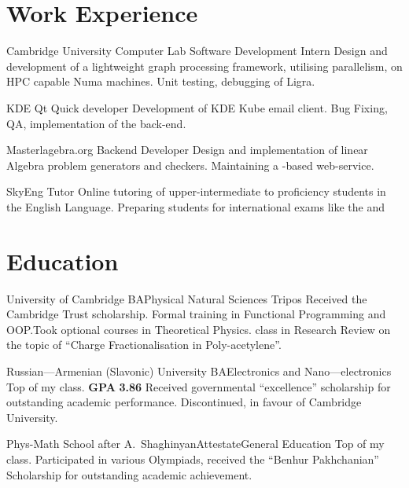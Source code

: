 \documentclass{CurriculumVitae}[10pt, draft]
\author{Aleksandr Petrosyan} \date{\today}
\begin{document}
\maketitle

\section*{Work Experience}

 {Cambridge University Computer Lab} {Software Development
  Intern} {Design and development of a lightweight graph processing
  framework, utilising parallelism, on HPC capable Numa machines. Unit
  testing, debugging of Ligra. }

 {KDE} {Qt Quick developer} {Development of KDE Kube
  email client. Bug Fixing, QA, implementation of the 
  back-end. }

 {Masterlagebra.org} {Backend Developer} {Design and
  implementation of linear Algebra problem generators and checkers.
  Maintaining a -based web-service. }

 {SkyEng} {Tutor} {Online tutoring of upper-intermediate
  to proficiency students in the English Language. Preparing students
  for international exams like the  
  and }

\section*{Education}

 {University of Cambridge} {BA}{Physical Natural
  Sciences Tripos} {Received the Cambridge Trust scholarship. Formal
  training in Functional Programming and OOP.\@ Took optional courses
  in Theoretical Physics.  class in Research Review on the
  topic of ``Charge Fractionalisation in Poly-acetylene''.}

 {Russian---Armenian (Slavonic) University}
{BA}{Electronics and Nano---electronics} {Top of my class. \textbf{GPA}
  \textbf{3.86} Received governmental ``excellence'' scholarship for
  outstanding academic performance. Discontinued, in favour of
  Cambridge University.}

 {Phys-Math School after
  A.~Shaghinyan}{Attestate}{General Education} {Top of my
  class. Participated in various Olympiads, received the ``Benhur
  Pakhchanian'' Scholarship for outstanding academic achievement. }
\end{document}
